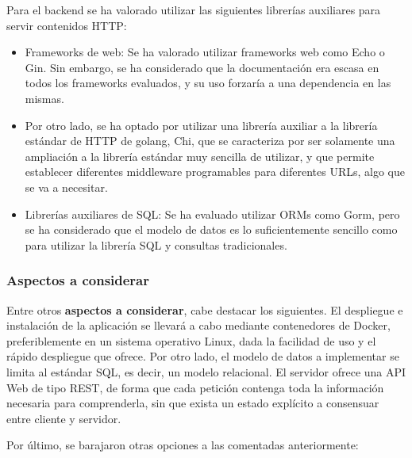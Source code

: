 \documentclass[11pt, a4paper, titlepage]{article}
\begin{document}
Para el backend se ha valorado utilizar las siguientes librerías auxiliares para servir contenidos HTTP:

\begin{itemize}
    \item Frameworks de web: Se ha valorado utilizar frameworks web como Echo o Gin. Sin embargo, se ha considerado que  la documentación era escasa en todos los frameworks evaluados, y su uso forzaría a una dependencia en las mismas. 
    
    \item Por otro lado, se ha optado por utilizar una librería auxiliar a la librería estándar de HTTP de golang, Chi, que se caracteriza por ser solamente una ampliación a la librería estándar muy sencilla de utilizar, y que permite establecer diferentes middleware programables para diferentes URLs, algo que se va a necesitar.
    
    \item Librerías auxiliares de SQL: Se ha evaluado utilizar ORMs como Gorm, pero se ha considerado que el modelo de datos es lo suficientemente sencillo como para utilizar la librería SQL y consultas tradicionales.
\end{itemize}

\subsubsection{Aspectos a considerar}

Entre otros \textbf{aspectos a considerar}, cabe destacar los siguientes. El despliegue e instalación de la aplicación se llevará a cabo mediante contenedores de Docker, preferiblemente en un sistema operativo Linux, dada la facilidad de uso y el rápido despliegue que ofrece. Por otro lado, el modelo de datos a implementar se limita al estándar SQL, es decir, un modelo relacional. El servidor ofrece una API Web de tipo REST, de forma que cada petición contenga toda la información necesaria para comprenderla, sin que exista un estado explícito a consensuar entre cliente y servidor. \newline

Por último, se barajaron otras opciones a las comentadas anteriormente:
\end{document}
